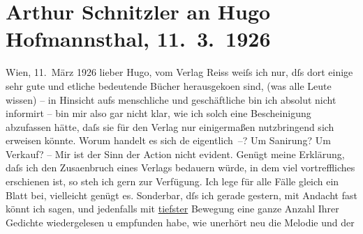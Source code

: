 

         
         \renewcommand{\erwaehntePersonen}{Personen: Hugo von Hofmannsthal, Lili Schnitzler}
         \renewcommand{\erwaehnteInstitutionen}{Institutionen: Erich-Reiss-Verlag}
         \renewcommand{\erwaehnteOrte}{Orte: Wien}
         \renewcommand{\erwaehnteWerke}{}
               \section[Arthur Schnitzler an Hugo Hofmannsthal, 11. 3. 1926]{ Arthur Schnitzler an Hugo Hofmannsthal, 11. 3. 1926}\nopagebreak{}\rehead{ }\begin{ledgroupsized}[t]{13cm}\normalsize\beginnumbering \toendnotes[C]{\smallbreak\pagebreak[2]} 
\pstart
           \raggedleft{}{\pb}Wien, 11. März 1926\pend
           \pstart
           lieber Hugo, vom Verlag Reiss
                    weiſs ich nur, dſs dort einige sehr gute und etliche bedeutende Bücher
                        herausgeko{\geminationm}en sind, (was alle Leute wissen) –
                        \introOben{}in Hinsicht aufs\introOben{} menschliche und geschäftliche bin
                    ich absolut nicht informirt – bin mir also gar nicht klar, wie ich solch eine
                    Bescheinigung abzufassen hätte, daſs sie für den Verlag nur einigermaßen
                    nutzbringend sich erweisen könnte. Worum handelt es sich de{\geminationn} eigentlich –? Um Sanirung? Um Verkauf? – Mir ist
                    der Sinn der Action nicht evident. Genügt meine Erklärung, daſs ich den
                    Zusa{\geminationm}enbruch eines Verlags bedauern würde, in dem viel vortreffliches
                    erschienen ist, so steh ich gern zur Verfügung. Ich lege für alle Fälle gleich
                    ein Blatt bei, vielleicht genügt es.\pend
           \pstart
           {\pb}Sonderbar, dſs ich gerade gestern, mit Andacht
                    fast könnt ich sagen, und jedenfalls mit \uline{tiefster} Bewegung eine ganze Anzahl Ihrer Gedichte \introOben{}wieder\introOben{}gelesen u empfunden habe, wie unerhört neu die Melodie und der

\end{ledgroupsized}
